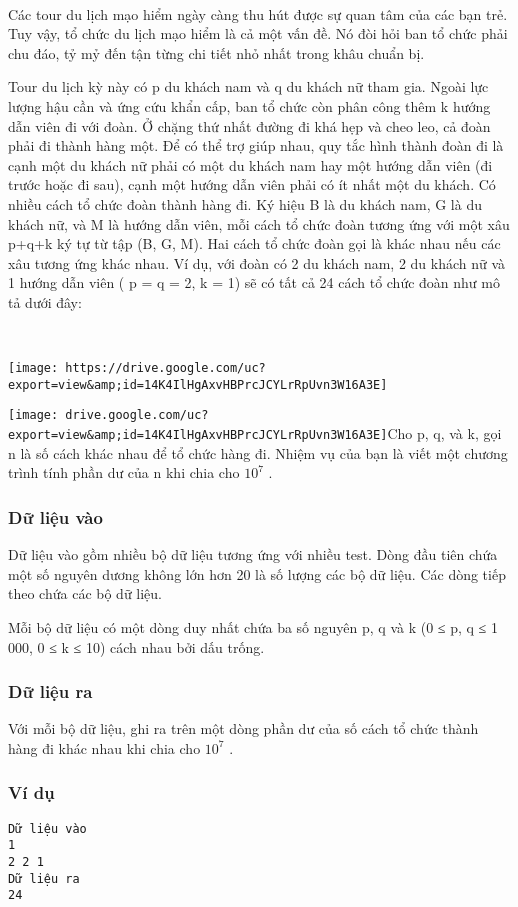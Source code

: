 

 

Các tour du lịch mạo hiểm ngày càng thu hút được sự quan tâm của các bạn trẻ. Tuy vậy, tổ chức du lịch mạo hiểm là cả một vấn đề. Nó đòi hỏi ban tổ chức phải chu đáo, tỷ mỷ đến tận từng chi tiết nhỏ nhất trong khâu chuẩn bị.

Tour du lịch kỳ này có p du khách nam và q du khách nữ tham gia. Ngoài lực lượng hậu cần và ứng cứu khẩn cấp, ban tổ chức còn phân công thêm k hướng dẫn viên đi với đoàn. Ở chặng thứ nhất đường đi khá hẹp và cheo leo, cả đoàn phải đi thành hàng một. Để có thể trợ giúp nhau, quy tắc hình thành đoàn đi là cạnh một du khách nữ phải có một du khách nam hay một hướng dẫn viên (đi trước hoặc đi sau), cạnh một hướng dẫn viên phải có ít nhất một du khách. Có nhiều cách tổ chức đoàn thành hàng đi. Ký hiệu B là du khách nam, G là du khách nữ, và M là hướng dẫn viên, mỗi cách tổ chức đoàn tương ứng với một xâu p+q+k ký tự từ tập (B, G, M). Hai cách tổ chức đoàn gọi là khác nhau nếu các xâu tương ứng khác nhau. Ví dụ, với đoàn có 2 du khách nam, 2 du khách nữ và 1 hướng dẫn viên ( p = q = 2, k = 1) sẽ có tất cả 24 cách tổ chức đoàn như mô tả dưới đây:

 


\texttt{[image: https://drive.google.com/uc?export=view\&amp;id=14K4IlHgAxvHBPrcJCYLrRpUvn3W16A3E]}


\texttt{[image: drive.google.com/uc?export=view\&amp;id=14K4IlHgAxvHBPrcJCYLrRpUvn3W16A3E]}Cho p, q, và k, gọi n là số cách khác nhau để tổ chức hàng đi. Nhiệm vụ của bạn là viết một chương trình tính phần dư của n khi chia cho $10^{7}$ .

\subsubsection{Dữ liệu vào}

Dữ liệu vào gồm nhiều bộ dữ liệu tương ứng với nhiều test. Dòng đầu tiên chứa một số nguyên dương không lớn hơn 20 là số lượng các bộ dữ liệu. Các dòng tiếp theo chứa các bộ dữ liệu.

Mỗi bộ dữ liệu có một dòng duy nhất chứa ba số nguyên p, q và k (0 ≤ p, q ≤ 1 000, 0 ≤ k ≤ 10) cách nhau bởi dấu trống.

\subsubsection{Dữ liệu ra}

Với mỗi bộ dữ liệu, ghi ra trên một dòng phần dư của số cách tổ chức thành hàng đi khác nhau khi chia cho $10^{7}$ .

\subsubsection{Ví dụ}
\begin{verbatim}
Dữ liệu vào	
1
2 2 1	
Dữ liệu ra
24
\end{verbatim}
